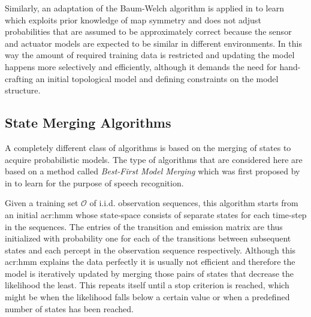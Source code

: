Similarly, an adaptation of the Baum-Welch algorithm is applied in \cite{koenig1996unsupervised} to learn  which exploits prior knowledge of map symmetry and does not adjust probabilities that are assumed to be approximately correct because the sensor and actuator models are expected to be similar in different environments.
In this way the amount of required training data is restricted and updating the model happens more selectively and efficiently, although it demands the need for hand-crafting an initial topological model and defining constraints on the model structure.


\subsection{State Merging Algorithms}
\label{sec:state-merging}

A completely different class of algorithms is based on the merging of states to acquire probabilistic models.
The type of algorithms that are considered here are based on a method called \textit{Best-First Model Merging} which was first proposed by \citeauthor{stolcke1994best} in \cite{stolcke1994best} to learn  for the purpose of speech recognition.

Given a training set $\mathcal{O}$ of i.i.d. observation sequences, this algorithm starts from an initial \acrshort{acr:hmm} whose state-space consists of separate states for each time-step in the sequences.
The entries of the transition and emission matrix are thus initialized with probability one for each of the transitions between subsequent states and each percept in the observation sequence respectively.
Although this \acrshort{acr:hmm} explains the data perfectly it is usually not efficient and therefore the model is iteratively updated by merging those pairs of states that decrease the likelihood the least.
This repeats itself until a stop criterion is reached, which might be when the likelihood falls below a certain value or when a predefined number of states has been reached.

